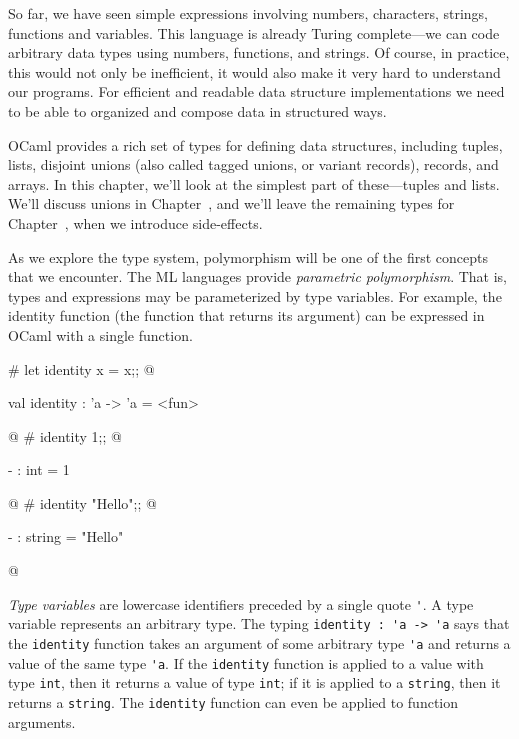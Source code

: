 
So far, we have seen simple
expressions involving numbers, characters, strings, functions and
variables.  This language is already Turing complete---we can code
arbitrary data types using numbers, functions, and strings.  Of course,
in practice, this would not only be inefficient, it would also make it
very hard to understand our programs.  For efficient and readable data
structure implementations we need to be able to organized and compose
data in structured ways.

OCaml provides a rich set of types for defining data structures,
including tuples, lists, disjoint unions (also called tagged unions,
or variant records), records, and arrays.  In this chapter, we'll look
at the simplest part of these---tuples and lists.  We'll discuss unions in
Chapter~, and we'll leave the remaining types for
Chapter~, when we introduce side-effects.


As we explore the type system, polymorphism will be one of the first
concepts that we encounter.  The ML languages provide \emph{parametric
polymorphism}.  That is, types and expressions may be parameterized by
type variables.  For example, the identity function (the function that
returns its argument) can be expressed in OCaml with a single function.

\begin{ocaml}
# let identity x = x;;
@
\begin{topoutput}
val identity : 'a -> 'a = <fun>
\end{topoutput}
@
# identity 1;;
@
\begin{topoutput}
- : int = 1
\end{topoutput}
@
# identity "Hello";;
@
\begin{topoutput}
- : string = "Hello"
\end{topoutput}
@
\end{ocaml}
%
\label{keyword:'}
\emph{Type variables} are lowercase identifiers preceded by a single
quote \hbox{\hbox{\lstinline/'/}}.  A type variable represents an arbitrary
type.  The typing \hbox{\hbox{\lstinline/identity : 'a -> 'a/}} says that the
\hbox{\hbox{\lstinline/identity/}} function takes an argument of some arbitrary type
\hbox{\hbox{\lstinline/'a/}} and returns a value of the same type \hbox{\lstinline/'a/}.  If the
\hbox{\hbox{\lstinline/identity/}} function is applied to a value with type \hbox{\lstinline/int/}, then
it returns a value of type \hbox{\hbox{\lstinline/int/}}; if it is applied to a
\hbox{\hbox{\lstinline/string/}}, then it returns a \hbox{\lstinline/string/}.  The \hbox{\lstinline/identity/}
function can even be applied to function arguments.

